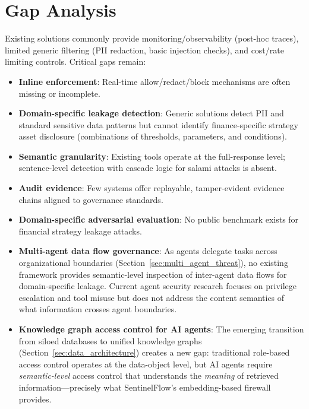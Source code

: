 \documentclass[12pt,a4paper]{article}
\begin{document}
\section{Gap Analysis}
\label{sec:gap}

Existing solutions commonly provide monitoring/observability (post-hoc traces), limited generic filtering (PII redaction, basic injection checks), and cost/rate limiting controls. Critical gaps remain:

\begin{itemize}[leftmargin=*]
    \item \textbf{Inline enforcement}: Real-time allow/redact/block mechanisms are often missing or incomplete.
    \item \textbf{Domain-specific leakage detection}: Generic solutions detect PII and standard sensitive data patterns but cannot identify finance-specific strategy asset disclosure (combinations of thresholds, parameters, and conditions).
    \item \textbf{Semantic granularity}: Existing tools operate at the full-response level; sentence-level detection with cascade logic for salami attacks is absent.
    \item \textbf{Audit evidence}: Few systems offer replayable, tamper-evident evidence chains aligned to governance standards.
    \item \textbf{Domain-specific adversarial evaluation}: No public benchmark exists for financial strategy leakage attacks.
    \item \textbf{Multi-agent data flow governance}: As agents delegate tasks across organizational boundaries (Section~\ref{sec:multi_agent_threat}), no existing framework provides semantic-level inspection of inter-agent data flows for domain-specific leakage. Current agent security research focuses on privilege escalation and tool misuse \cite{owasp_agentic_promptfoo, arxiv_privilege_escalation_2025} but does not address the content semantics of what information crosses agent boundaries.
    \item \textbf{Knowledge graph access control for AI agents}: The emerging transition from siloed databases to unified knowledge graphs (Section~\ref{sec:data_architecture}) creates a new gap: traditional role-based access control operates at the data-object level, but AI agents require \textit{semantic-level} access control that understands the \textit{meaning} of retrieved information---precisely what SentinelFlow's embedding-based firewall provides.
\end{itemize}
\end{document}

